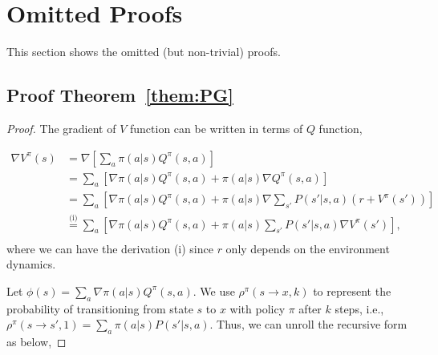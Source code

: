 \newpage
\appendix
\section{Omitted Proofs}

This section shows the omitted (but non-trivial) proofs.

\subsection{Proof Theorem~\ref{them:PG}}
\begin{proof}
The gradient of $V$ function can be written in terms of $Q$ function,

{\footnotesize
    \begin{equation}
        \begin{aligned}
            \nabla V^{\pi}(s) &= \nabla\left [ \sum_a \pi(a|s) Q^\pi (s,a)\right ] \\
            &=\sum_a\left [ \nabla\pi(a|s) Q^\pi (s,a) +\pi(a|s) \nabla Q^\pi (s,a) \right] \\
            &=\sum_a\left [ \nabla\pi(a|s) Q^\pi (s,a) +\pi(a|s) \nabla \sum_{s'}P(s'|s, a)(r+V^\pi(s')) \right] \\
            &\stackrel{\text{(i)}}{=}\sum_a\left [ \nabla\pi(a|s) Q^\pi (s,a) +\pi(a|s) \sum_{s'}P(s'|s, a)\nabla V^\pi(s') \right ], \\
        \end{aligned}\nonumber
    \end{equation}
}
where we can have the derivation (i) since $r$ only depends on the environment dynamics.

Let $\phi(s) = \sum_a \nabla\pi(a|s) Q^\pi (s,a)$. We use $\rho^\pi(s\rightarrow x, k)$ to represent the probability of transitioning from state $s$ to $x$ with policy $\pi$ after $k$ steps, i.e., $\rho^\pi(s \rightarrow s', 1)=\sum_a \pi(a|s) P(s'|s, a)$. Thus, we can unroll the recursive form as below,


\end{proof}
